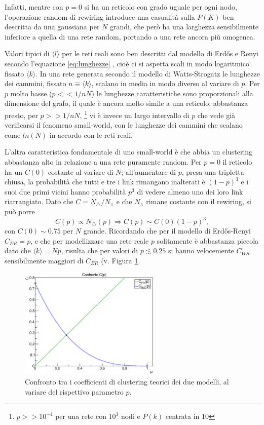 Infatti, mentre con $p=0$ si ha un reticolo con grado uguale per ogni nodo, l'operazione random di rewiring introduce una casualità sulla $P(K)$ ben descritta da una gaussiana per $N$ grandi, che però ha una larghezza sensibilmente inferiore a quella di una rete random, portando a una rete ancora più omogenea.  

Valori tipici di $\langle l \rangle$ per le reti reali sono ben descritti dal modello di Erdős e Renyi secondo l'equazione \ref{eq:lunghezze} \parencite{Barbalbert2002}, cioè ci si aspetta scali in modo logaritmico fissato $\langle k \rangle$. In una rete generata secondo il modello di Watts-Strogatz le lunghezze dei cammini, fissato $n \equiv \langle k \rangle$, scalano in media in modo diverso al variare di $p$. Per $p$ molto basse ($p << 1/nN$) le lunghezze caratteristiche sono proporzionali alla dimensione del grafo, il quale è ancora molto simile a una reticolo; abbastanza presto, per $p >> 1/nN$, \footnote{$p >> 10^{-4}$ per una rete con $10^3$ nodi e $P(k)$ centrata in 10} vi è invece un largo intervallo di $p$ che vede già verificarsi il fenomeno small-world, con le lunghezze dei cammini che scalano come $ln(N)$ in accordo con le reti reali.  

L'altra caratteristica fondamentale di uno small-world è che abbia un clustering abbastanza alto in relazione a una rete puramente random. Per $p = 0$ il reticolo ha un $C(0)$ costante al variare di $N$; all'aumentare di $p$, presa una tripletta chiusa, la probabilità che tutti e tre i link rimangano inalterati è $(1-p)^3$  e i suoi due primi vicini hanno probabilità $p^3$ di vedere almeno uno dei loro link riarrangiato. Dato che $C=N_\triangle/N_\wedge$ e che $N_\wedge$ rimane costante con il rewiring, si può porre 
\[C(p) \propto N_\triangle (p) \Rightarrow C(p) \sim C(0)(1-p)^3, \]
con $C(0) \sim 0.75$ per $N$ grande. Ricordando che per il modello di Erdős-Renyi $C_{ER}=p$, e che per modellizzare una rete reale $p$ solitamente è abbastanza piccola dato che $\langle k \rangle = Np$, risulta che per valori di $p \lesssim 0.25$ si hanno velocemente $C_{WS}$ sensibilmente maggiori di $C_{ER}$ (v. Figura \ref{fig:confrontoC}.

\begin{figure}[t!]
	\centering
	\includegraphics[width=0.6\textwidth]{./Immagini/Teoria/confrontoC}
	\caption[Confronto clustering.]{Confronto tra i coefficienti di clustering teorici dei due modelli, al variare del rispettivo parametro $p$.}
	\label{fig:confrontoC}
\end{figure}

